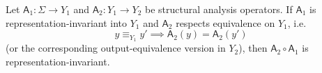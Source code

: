 \begin{lemma}
\label{lem:composition-canonical-intermediate-boundary}
Let $\mathsf A_1:\Sigma\to Y_1$ and $\mathsf A_2:Y_1\to Y_2$ be structural analysis operators.  If $\mathsf A_1$ is representation-invariant into $Y_1$ and $\mathsf A_2$ respects equivalence on $Y_1$, i.e.
\[
y\equiv_{Y_1}y'
\implies
\mathsf A_2(y)=\mathsf A_2(y')
\]
(or the corresponding output-equivalence version in $Y_2$), then $\mathsf A_2\circ\mathsf A_1$ is representation-invariant.
\end{lemma}


